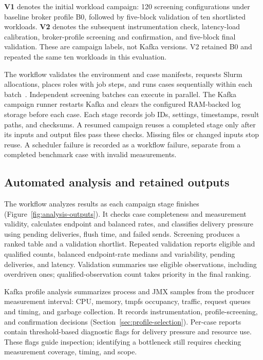 \documentclass[10pt]{article}
\begin{document}
\textbf{V1} denotes the initial workload campaign: 120 screening configurations
under baseline broker profile B0, followed by five-block validation of ten
shortlisted workloads.  \textbf{V2} denotes the subsequent instrumentation check,
latency-load calibration, broker-profile screening and confirmation, and
five-block final validation.  These are campaign labels, not Kafka versions.
V2 retained B0 and repeated the same ten workloads in this evaluation.

The workflow validates the environment and case manifests, requests Slurm
allocations, places roles with job steps, and runs cases sequentially within each
batch~\cite{jette2003slurm}.  Independent screening batches can execute in parallel.
The Kafka campaign runner restarts Kafka and clears the configured RAM-backed
log storage before each case.  Each stage records job IDs, settings, timestamps, result paths, and
checksums.  A resumed campaign reuses a completed stage only after its inputs and
output files pass these checks.  Missing files or changed inputs stop reuse.
A scheduler failure is recorded as a workflow failure, separate from a completed
benchmark case with invalid measurements.

\subsection{Automated analysis and retained outputs}
\label{sec:analysis-outputs}

The workflow analyzes results as each campaign stage finishes
(Figure~\ref{fig:analysis-outputs}).  It checks case completeness and measurement
validity, calculates endpoint and balanced rates, and classifies delivery
pressure using pending deliveries, flush time, and failed sends.  Screening produces a
ranked table and a validation shortlist.  Repeated validation reports eligible
and qualified counts, balanced endpoint-rate medians and variability, pending deliveries, and latency.
Validation summaries use eligible observations, including overdriven ones;
qualified-observation count takes priority in the final ranking.

Kafka profile analysis summarizes process and JMX samples from the producer
measurement interval:
CPU, memory, tmpfs occupancy, traffic, request queues and timing, and garbage
collection.  It records instrumentation, profile-screening, and confirmation
decisions (Section~\ref{sec:profile-selection}).  Per-case reports contain threshold-based diagnostic flags for
delivery pressure and resource use.  These flags guide inspection; identifying
a bottleneck still requires checking measurement coverage, timing, and scope.
\end{document}
